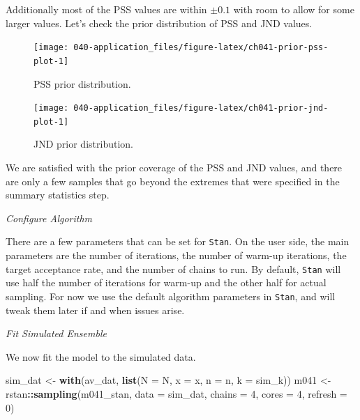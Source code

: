 \documentclass[11pt, oneside, openany]{scrbook}
\newenvironment{Shaded}{\begin{snugshade}}{\end{snugshade}}
\newcommand{\AttributeTok}[1]{\textcolor[rgb]{0.13,0.29,0.53}{#1}}
\newcommand{\DecValTok}[1]{\textcolor[rgb]{0.00,0.00,0.81}{#1}}
\newcommand{\FunctionTok}[1]{\textcolor[rgb]{0.13,0.29,0.53}{\textbf{#1}}}
\newcommand{\NormalTok}[1]{#1}
\newcommand{\OtherTok}[1]{\textcolor[rgb]{0.56,0.35,0.01}{#1}}
\newcommand{\SpecialCharTok}[1]{\textcolor[rgb]{0.81,0.36,0.00}{\textbf{#1}}}
\begin{document}
Additionally most of the PSS values are within \(\pm 0.1\) with room to allow for some larger values. Let's check the prior distribution of PSS and JND values.

\begin{figure}

{\centering \texttt{[image: 040-application\_files/figure-latex/ch041-prior-pss-plot-1]} 

}

\caption{PSS prior distribution.}\label{fig:ch041-prior-pss-plot}
\end{figure}

\begin{figure}

{\centering \texttt{[image: 040-application\_files/figure-latex/ch041-prior-jnd-plot-1]} 

}

\caption{JND prior distribution.}\label{fig:ch041-prior-jnd-plot}
\end{figure}

We are satisfied with the prior coverage of the PSS and JND values, and there are only a few samples that go beyond the extremes that were specified in the summary statistics step.

\emph{Configure Algorithm}

There are a few parameters that can be set for \texttt{Stan}. On the user side, the main parameters are the number of iterations, the number of warm-up iterations, the target acceptance rate, and the number of chains to run. By default, \texttt{Stan} will use half the number of iterations for warm-up and the other half for actual sampling. For now we use the default algorithm parameters in \texttt{Stan}, and will tweak them later if and when issues arise.

\emph{Fit Simulated Ensemble}

We now fit the model to the simulated data.


\begin{Shaded}
\begin{Highlighting}[]
\NormalTok{sim\_dat }\OtherTok{\textless{}{-}} \FunctionTok{with}\NormalTok{(av\_dat, }\FunctionTok{list}\NormalTok{(}\AttributeTok{N =}\NormalTok{ N, }\AttributeTok{x =}\NormalTok{ x, }\AttributeTok{n =}\NormalTok{ n, }\AttributeTok{k =}\NormalTok{ sim\_k)) }
\NormalTok{m041 }\OtherTok{\textless{}{-}}\NormalTok{ rstan}\SpecialCharTok{::}\FunctionTok{sampling}\NormalTok{(m041\_stan, }\AttributeTok{data =}\NormalTok{ sim\_dat, }
                        \AttributeTok{chains =} \DecValTok{4}\NormalTok{, }\AttributeTok{cores =} \DecValTok{4}\NormalTok{, }\AttributeTok{refresh =} \DecValTok{0}\NormalTok{)}
\end{Highlighting}
\end{Shaded}
\end{document}
